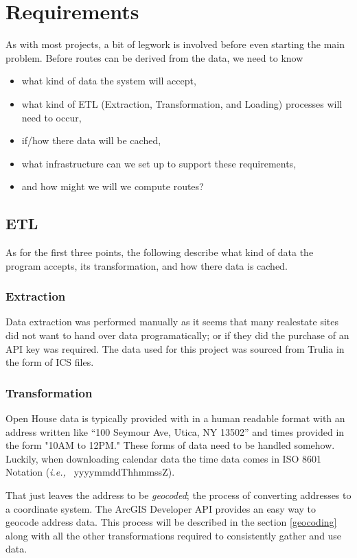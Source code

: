 \documentclass[11 pt]{article}
\theoremstyle{definition}
\theoremstyle{definition}
\def\ie{{i.e.,}\ }
\begin{document}
\section{Requirements}
As with most projects, a bit of legwork is involved before even starting the main problem. Before routes can be derived from the data, we need to know
\begin{itemize}
  \item what kind of data the system will accept,
  \item what kind of ETL (Extraction, Transformation, and Loading) processes will need to occur,
  \item if/how there data will be cached,
  \item what infrastructure can we set up to support these requirements,
  \item and how might we will we compute routes?
\end{itemize}

\subsection{ETL}
As for the first three points, the following describe what kind of data the program accepts, its transformation, and how there data is cached.

\subsubsection{Extraction}\label{E}
Data extraction was performed manually as it seems that many realestate sites did not want to hand over data programatically; or if they did the purchase of an API key was required. The data used for this project was sourced from Trulia\cite{Trulia} in the form of ICS files\cite{ICS}.

\subsubsection{Transformation}\label{T}
Open House data is typically provided with in a human readable format with an address written like ``100 Seymour Ave, Utica, NY 13502'' and times provided in the form "10AM to 12PM." These forms of data need to be handled somehow. Luckily, when downloading calendar data the time data comes in ISO 8601 Notation (\emph{\ie} yyyymmddThhmmssZ).

That just leaves the address to be \emph{geocoded}; the process of converting addresses to a coordinate system. The ArcGIS Developer API provides an easy way to geocode address data. This process will be described in the section \ref{geocoding} along with all the other transformations required to consistently gather and use data.
 
\end{document}
